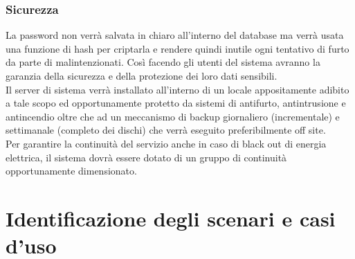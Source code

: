 \documentclass[a4paper,12pt]{article}
\begin{document}
\subsubsection{Sicurezza}
La password non verrà salvata in chiaro all'interno del database ma verrà usata una funzione di hash per criptarla e rendere quindi inutile ogni tentativo di furto da parte di malintenzionati. Così facendo gli utenti del sistema avranno la garanzia della sicurezza e della protezione dei loro dati sensibili. \\[1\baselineskip]
Il server di sistema verrà installato all'interno di un locale appositamente adibito a tale scopo ed opportunamente protetto da sistemi di antifurto, antintrusione e antincendio oltre che ad un meccanismo di backup giornaliero (incrementale) e settimanale (completo dei dischi) che verrà eseguito preferibilmente off site. \\[1\baselineskip]
Per garantire la continuità del servizio anche in caso di black out di energia elettrica, il sistema dovrà essere dotato di un gruppo di continuità opportunamente dimensionato.
\\[1.5em]
\clearpage

\section{Identificazione degli scenari e casi d'uso}
\end{document}
